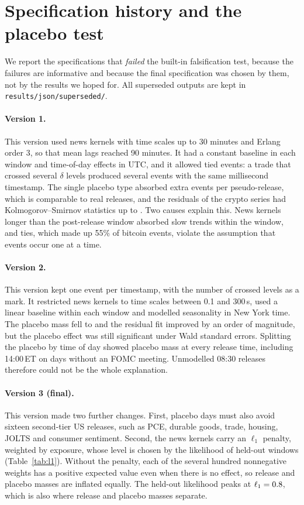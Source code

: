 \section{Specification history and the placebo test}\label{app:history}

We report the specifications that \emph{failed} the built-in falsification test, because
the failures are informative and because the final specification was chosen by them, not
by the results we hoped for. All superseded outputs are kept in
\texttt{results/json/superseded/}.

\paragraph{Version 1.} This version used news kernels with time scales up to 30 minutes and
Erlang order 3, so that mean lags reached 90 minutes. It had a constant baseline in each window
and time-of-day effects in UTC, and it allowed tied events: a trade that crossed several $\delta$
levels produced several events with the same millisecond timestamp. The single placebo type
absorbed \vOnePlacebo{} extra events per pseudo-release, which is comparable to real releases, and
the residuals of the crypto series had Kolmogorov--Smirnov statistics up to \vOneKSmax. Two causes
explain this. News kernels longer than the post-release window absorbed slow trends within the
window, and ties, which made up 55\% of bitcoin events, violate the assumption that events occur
one at a time.

\paragraph{Version 2.} This version kept one event per timestamp, with the number of crossed
levels as a mark. It restricted news kernels to time scales between 0.1 and 300\,s, used a linear
baseline within each window and modelled seasonality in New York time. The placebo mass fell to
\vTwoPlacebo{} and the residual fit improved by an order of magnitude, but the placebo effect was
still significant under Wald standard errors. Splitting the placebo by time of day showed placebo
mass at every release time, including 14:00\,ET on days without an FOMC meeting. Unmodelled 08:30
releases therefore could not be the whole explanation.

\paragraph{Version 3 (final).} This version made two further changes. First, placebo days must also
avoid sixteen second-tier US releases, such as PCE, durable goods, trade, housing, JOLTS and
consumer sentiment. Second, the news kernels carry an $\ell_1$ penalty, weighted by exposure, whose
level is chosen by the likelihood of held-out windows (Table~\ref{tab:l1}). Without the penalty,
each of the several hundred nonnegative weights has a positive expected value even when there is
no effect, so release and placebo masses are inflated equally. The held-out likelihood peaks at
$\ell_1=0.8$, which is also where release and placebo masses separate.

